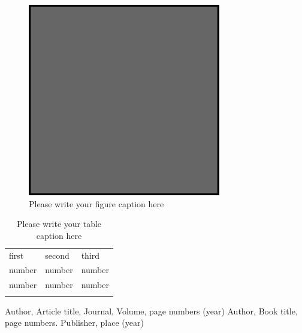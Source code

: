 \begin{figure}
\includegraphics[width=0.75\textwidth]{example.eps}
\caption{Please write your figure caption here}
\label{fig:2}       %
\end{figure}
%
\begin{table}
\caption{Please write your table caption here}
\label{tab:1}       %
\begin{tabular}{lll}
\hline\noalign{\smallskip}
first & second & third  \\
\noalign{\smallskip}\hline\noalign{\smallskip}
number & number & number \\
number & number & number \\
\noalign{\smallskip}\hline
\end{tabular}
\end{table}

\begin{thebibliography}{}
%
%
Author, Article title, Journal, Volume, page numbers (year)
Author, Book title, page numbers. Publisher, place (year)
\end{thebibliography}
\fi



